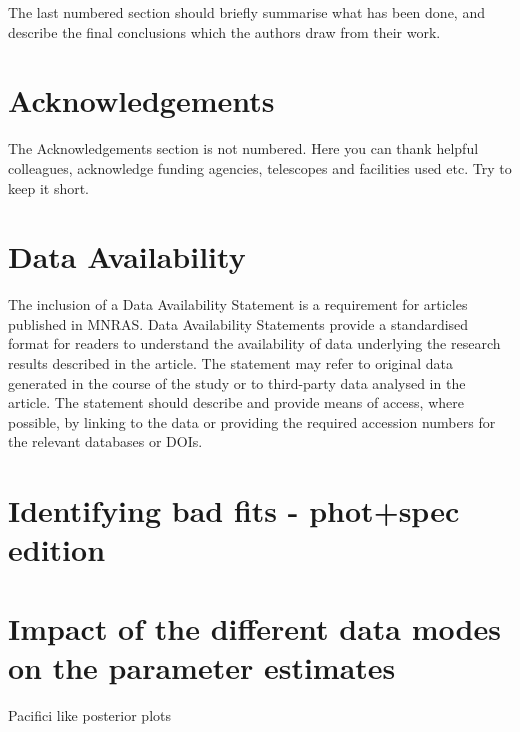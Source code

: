 \documentclass[fleqn,usenatbib]{mnras}
\begin{document}
The last numbered section should briefly summarise what has been done, and describe
the final conclusions which the authors draw from their work.

\section*{Acknowledgements}

The Acknowledgements section is not numbered. Here you can thank helpful
colleagues, acknowledge funding agencies, telescopes and facilities used etc.
Try to keep it short.

\section*{Data Availability}

 
The inclusion of a Data Availability Statement is a requirement for articles published in MNRAS. Data Availability Statements provide a standardised format for readers to understand the availability of data underlying the research results described in the article. The statement may refer to original data generated in the course of the study or to third-party data analysed in the article. The statement should describe and provide means of access, where possible, by linking to the data or providing the required accession numbers for the relevant databases or DOIs.












\appendix

\section{Identifying bad fits - phot+spec edition}

\section{Impact of the different data modes on the parameter estimates}
Pacifici like posterior plots



\bsp	%
\label{lastpage}
\end{document}
